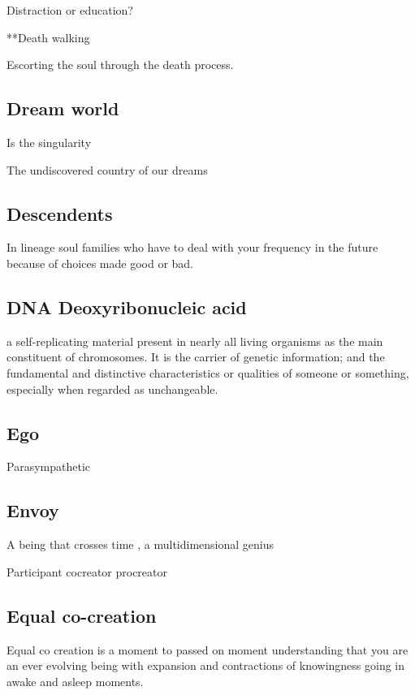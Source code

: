 Distraction or education?

**Death walking

Escorting the soul through the death process.

\subsection{Dream world}\label{dream-world}

Is the singularity

The undiscovered country of our dreams

\subsection{Descendents}\label{descendents}

In lineage soul families who have to deal with your frequency in the
future because of choices made good or bad.

\subsection{DNA Deoxyribonucleic acid}\label{dna-deoxyribonucleic-acid}

a self-replicating material present in nearly all living organisms as
the main constituent of chromosomes. It is the carrier of genetic
information; and the fundamental and distinctive characteristics or
qualities of someone or something, especially when regarded as
unchangeable.

\subsection{Ego}\label{ego}

Parasympathetic

\subsection{Envoy}\label{envoy}

A being that crosses time , a multidimensional genius

Participant cocreator procreator

\subsection{Equal co-creation}\label{equal-co-creation}

Equal co creation is a moment to passed on moment understanding that you
are an ever evolving being with expansion and contractions of
knowingness going in awake and asleep moments.

